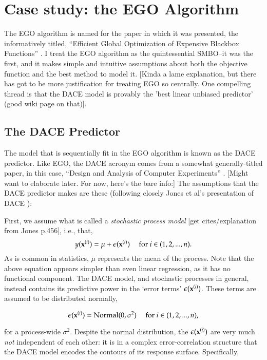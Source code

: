 \chapter{Case study: the EGO Algorithm}\label{ch:ego}

The EGO algorithm is named for the paper in which it was presented, the informatively titled, ``Efficient Global Optimization of Expensive Blackbox Functions'' \citep{jones_efficient_1998}. I treat the EGO algorithm as the quintessential SMBO--it was the first, and it makes simple and intuitive assumptions about both the objective function and the best method to model it. [Kinda a lame explanation, but there has got to be more justification for treating EGO so centrally. One compelling thread is that the DACE model is provably the 'best linear unbiased predictor' (good wiki page on that)]. 

\section{The DACE Predictor}\label{sec:dace}
The model that is sequentially fit in the EGO algorithm is known as the DACE predictor. Like EGO, the DACE acronym comes from a somewhat generally-titled paper, in this case, ``Design and Analysis of Computer Experiments'' \citep{sacks_design_1989}. [Might want to elaborate later. For now, here's the bare info:] The assumptions that the DACE predictor makes are these (following closely Jones et al's presentation of DACE \cite{jones_efficient_1998}):

First, we assume what is called a \emph{stochastic process model} [get cites/explanation from Jones p.456], i.e., that,
\begin{equation} \label{eq:stoch_proc}
y(\mathbf{x}^{(i)}) = \mu + \epsilon(\mathbf{x}^{(i)}) \ \ \ \ \ \text{for } i \in (1,2,...,n).
\end{equation}
As is common in statistics, $\mu$ represents the mean of the process. Note that the above equation appears simpler than even linear regression, as it has no functional component. The DACE model, and stochastic processes in general, instead contains its predictive power in the `error terms' $\epsilon(\mathbf{x}^{(i)})$. These terms are assumed to be distributed normally,

\begin{equation} \label{eq:dace_err}
\epsilon(\mathbf{x}^{(i)}) = \text{Normal}(0,\sigma^2)\ \ \ \ \ \text{for } i \in (1,2,...,n),
\end{equation}

for a process-wide $\sigma^2$. Despite the normal distribution, the $\epsilon(\mathbf{x}^{(i)})$ are very much \emph{not} independent of each other: it is in a complex error-correlation structure that the DACE model encodes the contours of its response surface. Specifically,

